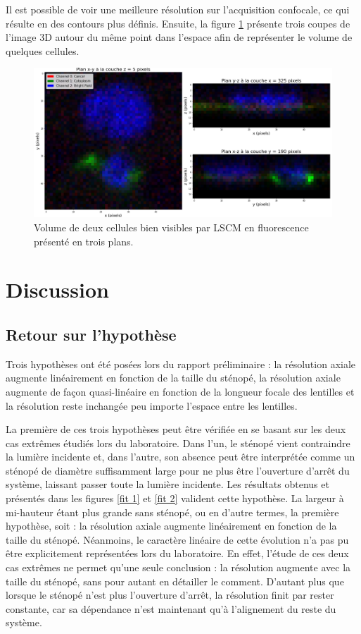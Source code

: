 \documentclass[11pt,letterpaper]{article}
\begin{document}
Il est possible de voir une meilleure résolution sur l'acquisition confocale, ce qui résulte en des contours plus définis. Ensuite, la figure \ref{3d_cells} présente trois coupes de l'image 3D autour du même point dans l'espace afin de
représenter le volume de quelques cellules.

\begin{figure}[H]
  \centering
  \includegraphics[scale=0.34]{volume.png}
  \caption{Volume de deux cellules bien visibles par LSCM en fluorescence présenté en trois plans.}
  \label{3d_cells}
\end{figure}


\section{Discussion}

\subsection{Retour sur l'hypothèse}

Trois hypothèses ont été posées lors du rapport préliminaire : la résolution axiale augmente linéairement en fonction de la taille du sténopé, la résolution axiale augmente de façon quasi-linéaire en fonction de la longueur focale des lentilles et la résolution reste inchangée peu importe l'espace entre les lentilles.

La première de ces trois hypothèses peut être vérifiée en se basant sur les deux cas extrêmes étudiés lors du laboratoire. Dans l'un, le sténopé vient contraindre la lumière incidente et, dans l'autre, son absence peut être interprétée comme un sténopé de diamètre suffisamment large pour ne plus être l'ouverture d'arrêt du système, laissant passer toute la lumière incidente. Les résultats obtenus et présentés dans les figures \ref{fit 1} et \ref{fit 2} valident cette hypothèse. La largeur à mi-hauteur étant plus grande sans sténopé, ou en d'autre termes, la première hypothèse, soit : la résolution axiale augmente linéairement en fonction de la taille du sténopé. Néanmoins, le caractère linéaire de cette évolution n'a pas pu être explicitement représentées lors du laboratoire. En effet, l'étude de ces deux cas extrêmes ne permet qu'une seule conclusion : la résolution augmente avec la taille du sténopé, sans pour autant en détailler le comment. D'autant plus que lorsque le sténopé n'est plus l'ouverture d'arrêt, la résolution finit par rester constante, car sa dépendance n'est maintenant qu'à l'alignement du reste du système.
\end{document}
